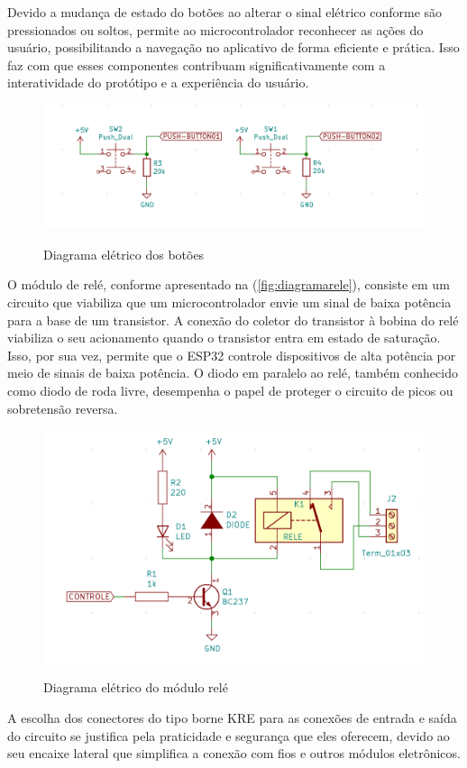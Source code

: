Devido a mudança de estado do botões ao alterar o sinal elétrico conforme 
são pressionados ou soltos, permite ao microcontrolador reconhecer as ações 
do usuário, possibilitando a navegação no aplicativo de forma eficiente 
e prática. Isso faz com que esses componentes contribuam significativamente 
com a interatividade do protótipo e a experiência do usuário.

\begin{figure}[h!]
    \centering
    \caption{Diagrama elétrico dos botões}
    \includegraphics[scale=0.25]{figuras/modulo_push.png}
    \fonte{}%
    \label{fig:diagramabotoes}
    \centering
\end{figure}

O módulo de relé, conforme apresentado na (\autoref{fig:diagramarele}), 
consiste em um circuito que viabiliza que um microcontrolador 
envie um sinal de baixa potência para a base de um transistor. A conexão do 
coletor do transistor à bobina do relé viabiliza o seu acionamento 
quando o transistor entra em estado de saturação. Isso, por sua vez, permite que o ESP32 
controle dispositivos de alta potência por meio de sinais de baixa potência. 
O diodo em paralelo ao relé, também conhecido como diodo de roda 
livre, desempenha o papel de proteger o circuito de picos ou sobretensão reversa.

\begin{figure}[h!]
    \centering
    \caption{Diagrama elétrico do módulo relé}
    \includegraphics[scale=0.2]{figuras/modulo_rele_esquema.png}
    \fonte{}%
    \label{fig:diagramarele}
    \centering
\end{figure}

A escolha dos conectores do tipo borne KRE para as conexões de entrada 
e saída do circuito se justifica pela praticidade e segurança que 
eles oferecem, devido ao seu encaixe lateral que simplifica a 
conexão com fios e outros módulos eletrônicos.